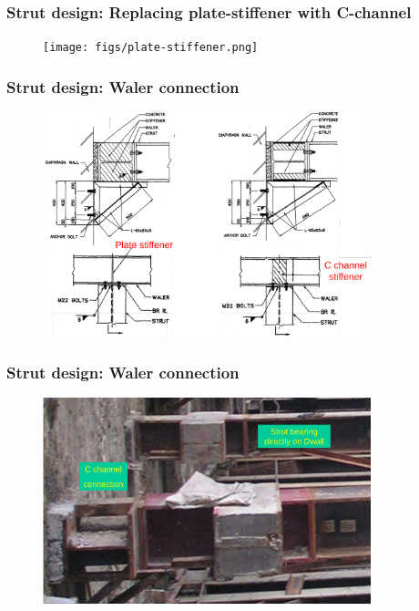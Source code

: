 \documentclass[handout]{beamer}
\begin{document}

\begin{frame}
\frametitle{Strut design: Replacing plate-stiffener with C-channel}
\begin{figure}[ht]
	\centering
	\texttt{[image: figs/plate-stiffener.png]}
\end{figure}
\end{frame}

\begin{frame}
\frametitle{Strut design: Waler connection}
\begin{figure}[ht]
	\centering
	\includegraphics[width=0.85\textwidth]{figs/plate-stiffeners-strut-waler.png}
\end{figure}
\end{frame}

\begin{frame}
\frametitle{Strut design: Waler connection}
\begin{figure}[ht]
	\centering
	\includegraphics[width=0.85\textwidth]{figs/c-channel-strut-dwall.png}
\end{figure}
\end{frame}
\end{document}
